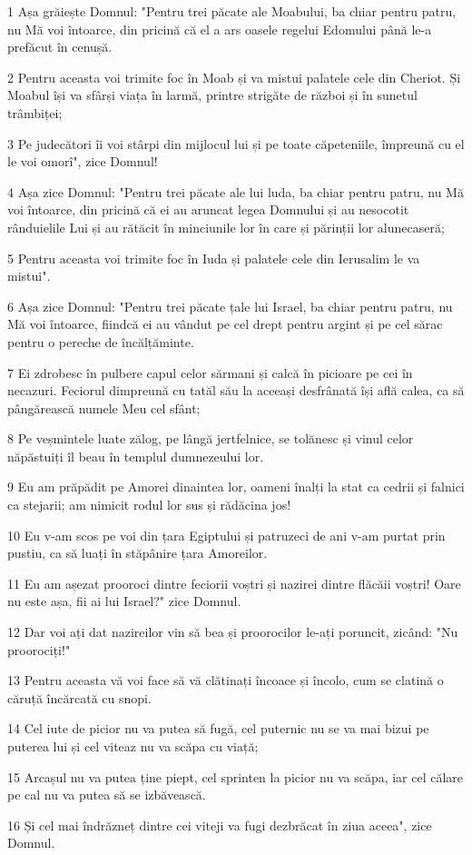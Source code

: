 \par 1 Așa grăiește Domnul: "Pentru trei păcate ale Moabului, ba chiar pentru patru, nu Mă voi întoarce, din pricină că el a ars oasele regelui Edomului până le-a prefăcut în cenușă.
\par 2 Pentru aceasta voi trimite foc în Moab și va mistui palatele cele din Cheriot. Și Moabul își va sfârși viața în larmă, printre strigăte de război și în sunetul trâmbiței;
\par 3 Pe judecători îi voi stârpi din mijlocul lui și pe toate căpeteniile, împreună cu el le voi omorî", zice Domnul!
\par 4 Așa zice Domnul: "Pentru trei păcate ale lui luda, ba chiar pentru patru, nu Mă voi întoarce, din pricină că ei au aruncat legea Domnului și au nesocotit rânduielile Lui și au rătăcit în minciunile lor în care și părinții lor alunecaseră;
\par 5 Pentru aceasta voi trimite foc în Iuda și palatele cele din Ierusalim le va mistui".
\par 6 Așa zice Domnul: "Pentru trei păcate țale lui Israel, ba chiar pentru patru, nu Mă voi întoarce, fiindcă ei au vândut pe cel drept pentru argint și pe cel sărac pentru o pereche de încălțăminte.
\par 7 Ei zdrobesc în pulbere capul celor sărmani și calcă în picioare pe cei în necazuri. Feciorul dimpreună cu tatăl său la aceeași desfrânată își află calea, ca să pângărească numele Meu cel sfânt;
\par 8 Pe veșmintele luate zălog, pe lângă jertfelnice, se tolănesc și vinul celor năpăstuiți îl beau în templul dumnezeului lor.
\par 9 Eu am prăpădit pe Amorei dinaintea lor, oameni înalți la stat ca cedrii și falnici ca stejarii; am nimicit rodul lor sus și rădăcina jos!
\par 10 Eu v-am scos pe voi din țara Egiptului și patruzeci de ani v-am purtat prin pustiu, ca să luați în stăpânire țara Amoreilor.
\par 11 Eu am așezat prooroci dintre feciorii voștri și nazirei dintre flăcăii voștri! Oare nu este așa, fii ai lui Israel?" zice Domnul.
\par 12 Dar voi ați dat nazireilor vin să bea și proorocilor le-ați poruncit, zicând: "Nu proorociți!"
\par 13 Pentru aceasta vă voi face să vă clătinați încoace și încolo, cum se clatină o căruță încărcată cu snopi.
\par 14 Cel iute de picior nu va putea să fugă, cel puternic nu se va mai bizui pe puterea lui și cel viteaz nu va scăpa cu viață;
\par 15 Arcașul nu va putea ține piept, cel sprinten la picior nu va scăpa, iar cel călare pe cal nu va putea să se izbăvească.
\par 16 Și cel mai îndrăzneț dintre cei viteji va fugi dezbrăcat în ziua aceea", zice Domnul.

